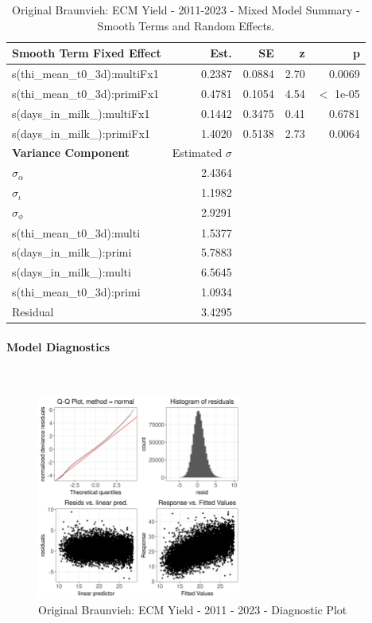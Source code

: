 \newpage
\begin{table}[H]
\centering
\begin{tabular}
{l | r | r | r | r}
\textbf{Smooth Term Fixed Effect} & Est. & SE & z & p\\
\hline
\hline
s(thi\_mean\_t0\_3d):multiFx1 & 0.2387 & 0.0884 & 2.70 & 0.0069\\
s(thi\_mean\_t0\_3d):primiFx1 & 0.4781 & 0.1054 & 4.54 & $<$ 1e-05\\
s(days\_in\_milk\_):multiFx1 & 0.1442 & 0.3475 & 0.41 & 0.6781\\
s(days\_in\_milk\_):primiFx1 & 1.4020 & 0.5138 & 2.73 & 0.0064\\
\hline
\textbf{Variance Component} & Estimated $\sigma$ & & & \\
\hline
\hline
$\sigma_\alpha$ & 2.4364 & & & \\
$\sigma_\iota$ & 1.1982 & & & \\
$\sigma_\phi$ & 2.9291 & & & \\
s(thi\_mean\_t0\_3d):multi &  1.5377 & & & \\
s(days\_in\_milk\_):primi & 5.7883 & & & \\
s(days\_in\_milk\_):multi & 6.5645 & & & \\
s(thi\_mean\_t0\_3d):primi & 1.0934 & & & \\
Residual & 3.4295 & & & \\
\end{tabular}
\caption[]{Original Braunvieh: ECM Yield - 2011-2023 - Mixed Model Summary - Smooth Terms and Random Effects.}
\end{table}


\paragraph{Model Diagnostics} \quad \\
\begin{figure}[H]
    \centering
    \includegraphics[width=0.6\textwidth]{thesis/figures/models/ecm/after2010/ob_ecm_after2010/ob_ecm_after2010_diagnostics.png}
    \caption[]{Original Braunvieh: ECM Yield - 2011 - 2023 - Diagnostic Plot}
\end{figure}

